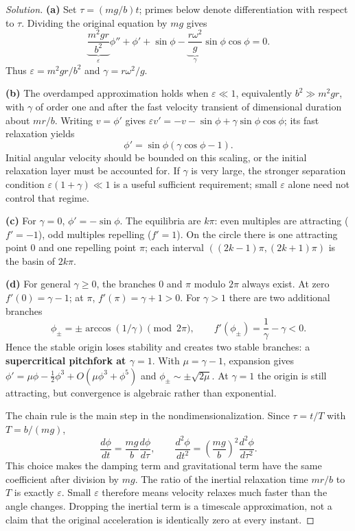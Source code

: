 \documentclass[10pt]{amsart}
\newenvironment{solution}
{\begin{proof}[Solution]}
{\end{proof}}
\begin{document}
\begin{enumerate}[label=\arabic*), leftmargin=*, itemsep=1em]
\begin{solution}
\textbf{(a)} Set $\tau=(mg/b)t$; primes below denote differentiation with respect to $\tau$. Dividing the original equation by $mg$ gives
\[
\underbrace{\frac{m^2gr}{b^2}}_{\varepsilon}\phi''+\phi'+\sin\phi-
\underbrace{\frac{r\omega^2}{g}}_{\gamma}\sin\phi\cos\phi=0.
\]
Thus $\varepsilon=m^2gr/b^2$ and $\gamma=r\omega^2/g$.

\textbf{(b)} The overdamped approximation holds when $\varepsilon\ll1$, equivalently $b^2\gg m^2gr$, with $\gamma$ of order one and after the fast velocity transient of dimensional duration about $mr/b$. Writing $v=\phi'$ gives $\varepsilon v'=-v-\sin\phi+\gamma\sin\phi\cos\phi$; its fast relaxation yields
\[
\phi'=\sin\phi(\gamma\cos\phi-1).
\]
Initial angular velocity should be bounded on this scaling, or the initial relaxation layer must be accounted for. If $\gamma$ is very large, the stronger separation condition $\varepsilon(1+\gamma)\ll1$ is a useful sufficient requirement; small $\varepsilon$ alone need not control that regime.

\textbf{(c)} For $\gamma=0$, $\phi'=-\sin\phi$. The equilibria are $k\pi$: even multiples are attracting ($f'=-1$), odd multiples repelling ($f'=1$). On the circle there is one attracting point $0$ and one repelling point $\pi$; each interval $((2k-1)\pi,(2k+1)\pi)$ is the basin of $2k\pi$.

\textbf{(d)} For general $\gamma\ge0$, the branches $0$ and $\pi$ modulo $2\pi$ always exist. At zero $f'(0)=\gamma-1$; at $\pi$, $f'(\pi)=\gamma+1>0$. For $\gamma>1$ there are two additional branches
\[
\phi_\pm=\pm\arccos(1/\gamma)\pmod{2\pi},\qquad
f'(\phi_\pm)=\frac1\gamma-\gamma<0.
\]
Hence the stable origin loses stability and creates two stable branches: a \textbf{supercritical pitchfork at $\gamma=1$}. With $\mu=\gamma-1$, expansion gives $\phi'=\mu\phi-\tfrac12\phi^3+O(\mu\phi^3+\phi^5)$ and $\phi_\pm\sim\pm\sqrt{2\mu}$. At $\gamma=1$ the origin is still attracting, but convergence is algebraic rather than exponential.

The chain rule is the main step in the nondimensionalization. Since $\tau=t/T$ with $T=b/(mg)$,
\[
\frac{d\phi}{dt}=\frac{mg}{b}\frac{d\phi}{d\tau},\qquad
\frac{d^2\phi}{dt^2}=\left(\frac{mg}{b}\right)^2\frac{d^2\phi}{d\tau^2}.
\]
This choice makes the damping term and gravitational term have the same coefficient after division by $mg$. The ratio of the inertial relaxation time $mr/b$ to $T$ is exactly $\varepsilon$. Small $\varepsilon$ therefore means velocity relaxes much faster than the angle changes. Dropping the inertial term is a timescale approximation, not a claim that the original acceleration is identically zero at every instant.


\end{solution}
\end{enumerate}
\end{document}
